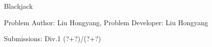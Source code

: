 \begin{Solution}{Blackjack}

\begin{frame}{\ProblemName}

\small Problem Author: Liu Hongyang, Problem Developer: Liu Hongyang \par \vspace{0.3cm}

\small Submissions: Div.1 (?+?)/(?+?) \par \vspace{0.5cm}


\end{frame}

\end{Solution}
